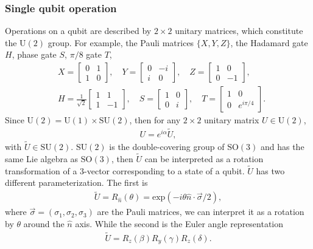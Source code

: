 \documentclass{article}
\begin{document}
\subsubsection{Single qubit operation}
Operations on a qubit are described by $2\times 2$ unitary matrices, which constitute the $\text{U}(2)$ group. For example, the Pauli matrices $\{X,Y,Z\}$, the Hadamard gate $H$, phase gate $S$, $\pi/8$ gate $T$,
\begin{align}
	& X= \left[ \begin{array}{cc} 0&1\\ 1&0 \end{array} \right],\quad 
	Y= \left[ \begin{array}{cc} 0&-i\\ i&0 \end{array} \right], \quad
	Z= \left[ \begin{array}{cc} 1&0\\ 0&-1 \end{array} \right], \\
	& H= \frac{1}{\sqrt{2}}\left[\begin{array}{cc} 1&1\\ 1&-1 \end{array} \right] , \quad
	S= \left[\begin{array}{cc} 1&0\\ 0&i \end{array} \right] ,\quad
	T= \left[\begin{array}{cc} 1&0\\ 0&e^{i \pi/4} \end{array} \right] .
\end{align}
Since $\text{U}(2)=\text{U}(1)\times \text{SU}(2)$, then for any $2\times2$ unitary matrix $U\in \text{U}(2)$, 
\begin{align}
	U=e^{i\alpha}\widetilde{U},
\end{align}
with $\widetilde{U}\in \text{SU}(2)$. 
$\text{SU}(2)$ is the double-covering group of $\text{SO}(3)$ and has the same Lie algebra as $\text{SO}(3)$, then $\widetilde{U}$ can be interpreted as a rotation transformation of a $3$-vector corresponding to a state of a qubit. $\widetilde{U}$ has two different parameterization. The first is 
\begin{align}
	\widetilde{U}=R_{\hat{n}}(\theta)= \text{exp}(-i\theta \hat{n}\cdot \vec{\sigma}/2), 
\end{align} 
where $\vec{\sigma}=(\sigma_1,\sigma_2,\sigma_3)$ are the Pauli matrices, we can interpret it as a rotation by $\theta$ around the $\hat{n}$ axis.
While the second is the Euler angle representation
\begin{align}
	\widetilde{U}=R_{z}(\beta)R_{y}(\gamma)R_{z}(\delta).
\end{align}
\end{document}
